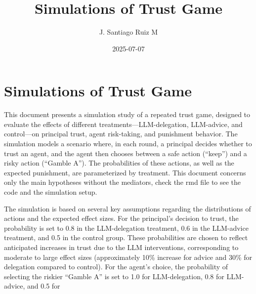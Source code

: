 \documentclass[
]{article}
\title{Simulations of Trust Game}
\author{J. Santiago Ruiz M}
\date{2025-07-07}
\begin{document}
\maketitle

\section{Simulations of Trust Game}\label{simulations-of-trust-game}

This document presents a simulation study of a repeated trust game,
designed to evaluate the effects of different
treatments---LLM-delegation, LLM-advice, and control---on principal
trust, agent risk-taking, and punishment behavior. The simulation models
a scenario where, in each round, a principal decides whether to trust an
agent, and the agent then chooses between a safe action (``keep'') and a
risky action (``Gamble A''). The probabilities of these actions, as well
as the expected punishment, are parameterized by treatment. This
document concerns only the main hypotheses without the mediators, check
the rmd file to see the code and the simulation setup.

The simulation is based on several key assumptions regarding the
distributions of actions and the expected effect sizes. For the
principal's decision to trust, the probability is set to 0.8 in the
LLM-delegation treatment, 0.6 in the LLM-advice treatment, and 0.5 in
the control group. These probabilities are chosen to reflect anticipated
increases in trust due to the LLM interventions, corresponding to
moderate to large effect sizes (approximately 10\% increase for advice
and 30\% for delegation compared to control). For the agent's choice,
the probability of selecting the riskier ``Gamble A'' is set to 1.0 for
LLM-delegation, 0.8 for LLM-advice, and 0.5 for
\end{document}
